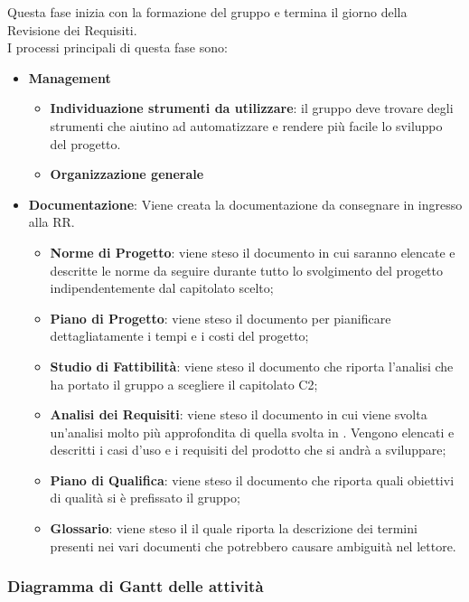 	Questa fase inizia con la formazione del gruppo e termina il giorno della Revisione dei Requisiti. \\
	I processi principali di questa fase sono: 
	\begin{itemize}
		\item \textbf{Management}
			\att
			\begin{itemize} %
				\item \textbf{Individuazione strumenti da utilizzare}: il gruppo deve trovare degli strumenti che aiutino ad automatizzare e rendere più facile lo sviluppo del progetto.
				\item \textbf{Organizzazione generale}
			\end{itemize}
		\item \textbf{Documentazione}: Viene creata la documentazione da consegnare in ingresso alla RR.
		\att
		\begin{itemize} %
			\item \textbf{Norme di Progetto}: viene steso il documento \NPdocRR in cui saranno elencate e descritte le norme da seguire durante tutto lo svolgimento del progetto indipendentemente dal capitolato scelto; 
			\item \textbf{Piano di Progetto}: viene steso il documento \PPdocRR per pianificare dettagliatamente i tempi e i costi del progetto;
			\item \textbf{Studio di Fattibilità}: viene steso il documento \SFdocRR che riporta l'analisi che ha portato il gruppo a scegliere il capitolato C2;
			\item \textbf{Analisi dei Requisiti}: viene steso il documento \ARdocRR in cui viene svolta un'analisi molto più approfondita di quella svolta in \SFdocRR. Vengono elencati e descritti i casi d'uso e i requisiti del prodotto che si andrà a sviluppare;
			\item \textbf{Piano di Qualifica}: viene steso il documento \PQdocRR che riporta quali obiettivi di qualità si è prefissato il gruppo;
			\item \textbf{Glossario}: viene steso il \GldocRR il quale riporta la descrizione dei termini presenti nei vari documenti che potrebbero causare ambiguità nel lettore.
		\end{itemize}
	\end{itemize}
	
		
		\subsubsection{Diagramma di Gantt delle attività}
		
